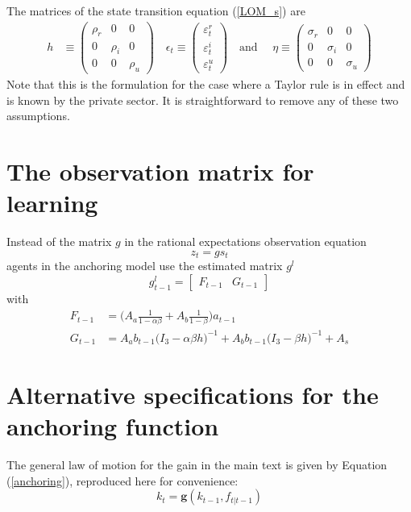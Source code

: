 \documentclass[11pt]{article}
\renewcommand{\[}{\begin{equation}}
\renewcommand{\]}{\end{equation}}
\begin{document}
The matrices of the state transition equation (\ref{LOM_s}) are
 \begin{align}
 h  & \equiv \begin{pmatrix} \rho_r & 0 & 0 \\ 0& \rho_i & 0 \\ 0&0& \rho_u 
 \end{pmatrix}  \quad 
 \epsilon_t \equiv \begin{pmatrix}\varepsilon_t^{r} \\ \varepsilon_t^{i}  \\ \varepsilon_t^{u} 
 \end{pmatrix}  \quad  \text{and } \quad \eta  \equiv \begin{pmatrix} \sigma_r & 0 & 0 \\ 0& \sigma_i & 0 \\ 0&0& \sigma_u 
 \end{pmatrix} 
 \end{align}
Note that this is the formulation for the case where a Taylor rule is in effect and is known by the private sector. It is straightforward to remove any of these two assumptions.



\section{The observation matrix for learning}\label{app_FG}
Instead of the matrix $g$ in the rational expectations observation equation
\begin{equation}
z_t = g s_t \label{RE_obs}
\end{equation}
agents in the anchoring model use the estimated matrix $g^l$
\begin{equation}
g_{t-1}^l = \begin{bmatrix} F_{t-1} & G_{t-1} \end{bmatrix}
\end{equation}
with
\begin{align}
F_{t-1} & = \bigg(A_a \frac{1}{1-\alpha\beta} + A_b\frac{1}{1-\beta} \bigg)a_{t-1}\\
G_{t-1} & = A_a b_{t-1}\bigg(I_3 - \alpha\beta h \bigg)^{-1} + A_b b_{t-1}\bigg(I_3 - \beta h \bigg)^{-1} + A_s
\end{align}

\section{Alternative specifications for the anchoring function}\label{alternative_criteria}
The general law of motion for the gain in the main text is given by Equation (\ref{anchoring}), reproduced here for convenience:
\begin{equation}
k_t  = \mathbf{g}(k_{t-1},f_{t|t-1}) 
\end{equation}
\end{document}

